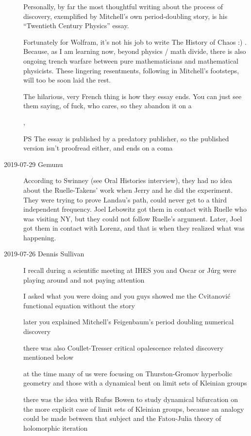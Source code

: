 \begin{description}
Personally, by far the most thoughtful writing about the process of
discovery, exemplified by Mitchell's own period-doubling story, is his
``Twentieth Century Physics'' essay.

Fortunately for Wolfram, it's not his job to write The History of Chaos
:) . Because, as I am learning now, beyond physics / math divide, there
is also ongoing trench warfare between pure mathematicians and
mathematical physicists. These lingering resentments, following in
Mitchell's footsteps, will too be soon laid the rest.

The hilarious, very French thing is how they essay ends. You can just see
them saying, of fuck, who cares, so they abandon it on a %

,

\medskip

PS The essay is published by a predatory publisher, so the published
version isn't proofread either, and ends on a coma

\item[2019-07-29 Gemunu]
According to  {Swinney}
(see Oral Histories interview), they had no idea about the Ruelle-Takens'
work when Jerry and he did the experiment. They were trying to prove
Landau's path, could never get to a third independent frequency. Joel
Lebowitz got them in contact with Ruelle who was visiting NY, but they
could not follow Ruelle's argument. Later, Joel got them in contact with
Lorenz, and that is when they realized what was happening.

\item[2019-07-26 Dennis Sullivan] %
I recall during a scientific meeting at IHES you and Oscar or J{\'u}rg
were playing around and not paying attention

I asked what you were doing and you guys showed me the Cvitanovi{\'c} functional
equation without the story

later you explained Mitchell's Feigenbaum's period doubling
numerical discovery

there was also Coullet-Tresser critical opalescence related discovery
mentioned below

at the time  many of us were focusing on Thurston-Gromov hyperbolic
geometry and  those with a dynamical bent on limit sets of Kleinian
groups

there was the idea with Rufus Bowen to study dynamical bifurcation on the
more explicit case of limit sets of Kleinian groups,
because an analogy could be made between that subject and the Fatou-Julia
theory of holomorphic iteration


\end{description}
